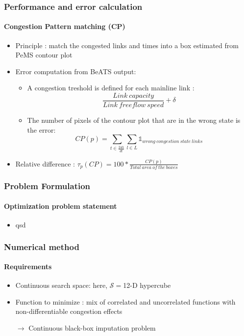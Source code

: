 \documentclass[fleqn]{beamer}
\begin{document}
\begin{frame}
	\frametitle{Performance and error calculation}
	\framesubtitle{Congestion Pattern matching (CP)}
	\begin{itemize}
		\item Principle : match the congested links and times into a box estimated from PeMS contour plot
		\item Error computation from BeATS output:
		\begin{itemize}
			\item A congestion treshold is defined for each mainline link :
			\begin{equation*} 
				\frac{Link\ capacity}{Link\ freeflow\ speed}+\delta
			\end{equation*}
			\item The number of pixels of the contour plot that are in the wrong state is the error:
			\begin{equation*}
				CP(p)=\sum_{t\in{\frac{24h}{dt}}}\sum_{l\in{L}}\mathds{1}_{wrong\ congestion\ state\ links}
			\end{equation*}
			\end{itemize}
		\item Relative difference : $\tau_{p}(CP)=100* \frac{CP(p)}{Total\ area\ of\ the\ boxes}$
	\end{itemize}
\end{frame}



\begin{frame}
	\frametitle{Problem Formulation}
	\framesubtitle{Optimization problem statement}
	\begin{itemize}
	\item qsd
	\end{itemize}
\end{frame}


\begin{frame}
	\frametitle{Numerical method}
	\framesubtitle{Requirements}
	\begin{itemize}
		\item Continuous search space: here, $\mathcal{S}=$12-D hypercube
		\item Function to minimize : mix of correlated and uncorrelated functions with non-differentiable congestion effects
		\item[$\rightarrow$]Continuous black-box imputation problem
	\end{itemize}
\end{frame}
\end{document}
